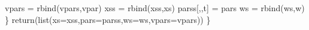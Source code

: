 \documentclass[
]{book}
\newenvironment{Shaded}{\begin{snugshade}}{\end{snugshade}}
\newcommand{\AttributeTok}[1]{\textcolor[rgb]{0.77,0.63,0.00}{#1}}
\newcommand{\FunctionTok}[1]{\textcolor[rgb]{0.00,0.00,0.00}{#1}}
\newcommand{\NormalTok}[1]{#1}
\newcommand{\OtherTok}[1]{\textcolor[rgb]{0.56,0.35,0.01}{#1}}
\theoremstyle{break}
\theoremstyle{nonumberplain}
\begin{document}
\begin{Shaded}
\begin{Highlighting}[]
\NormalTok{    vpars        }\OtherTok{=} \FunctionTok{rbind}\NormalTok{(vpars,vpar)}
\NormalTok{    xss         }\OtherTok{=} \FunctionTok{rbind}\NormalTok{(xss,xs)}
\NormalTok{    parss[,,t]  }\OtherTok{=}\NormalTok{ pars }
\NormalTok{    ws          }\OtherTok{=} \FunctionTok{rbind}\NormalTok{(ws,w)}
\NormalTok{  \}}
  \FunctionTok{return}\NormalTok{(}\FunctionTok{list}\NormalTok{(}\AttributeTok{xs=}\NormalTok{xss,}\AttributeTok{pars=}\NormalTok{parss,}\AttributeTok{ws=}\NormalTok{ws,}\AttributeTok{vpars=}\NormalTok{vpars))}
\NormalTok{\}}
\end{Highlighting}
\end{Shaded}


\backmatter
\end{document}
